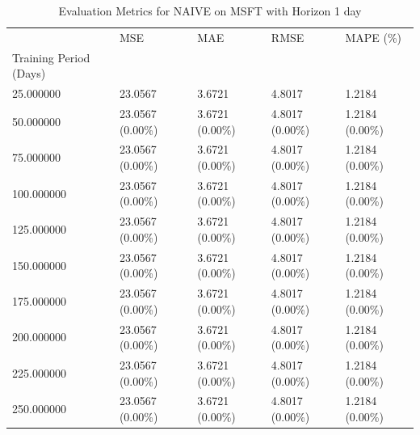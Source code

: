 \begin{table}
\caption{Evaluation Metrics for NAIVE on MSFT with Horizon 1 day}
\label{tab:naive_MSFT_h1_metrics}
\begin{tabular}{lllll}
\toprule
 & MSE & MAE & RMSE & MAPE (\%) \\
Training Period (Days) &  &  &  &  \\
\midrule
25.000000 & 23.0567 & 3.6721 & 4.8017 & 1.2184 \\
50.000000 & 23.0567 (0.00\%) & 3.6721 (0.00\%) & 4.8017 (0.00\%) & 1.2184 (0.00\%) \\
75.000000 & 23.0567 (0.00\%) & 3.6721 (0.00\%) & 4.8017 (0.00\%) & 1.2184 (0.00\%) \\
100.000000 & 23.0567 (0.00\%) & 3.6721 (0.00\%) & 4.8017 (0.00\%) & 1.2184 (0.00\%) \\
125.000000 & 23.0567 (0.00\%) & 3.6721 (0.00\%) & 4.8017 (0.00\%) & 1.2184 (0.00\%) \\
150.000000 & 23.0567 (0.00\%) & 3.6721 (0.00\%) & 4.8017 (0.00\%) & 1.2184 (0.00\%) \\
175.000000 & 23.0567 (0.00\%) & 3.6721 (0.00\%) & 4.8017 (0.00\%) & 1.2184 (0.00\%) \\
200.000000 & 23.0567 (0.00\%) & 3.6721 (0.00\%) & 4.8017 (0.00\%) & 1.2184 (0.00\%) \\
225.000000 & 23.0567 (0.00\%) & 3.6721 (0.00\%) & 4.8017 (0.00\%) & 1.2184 (0.00\%) \\
250.000000 & 23.0567 (0.00\%) & 3.6721 (0.00\%) & 4.8017 (0.00\%) & 1.2184 (0.00\%) \\
\bottomrule
\end{tabular}
\end{table}
